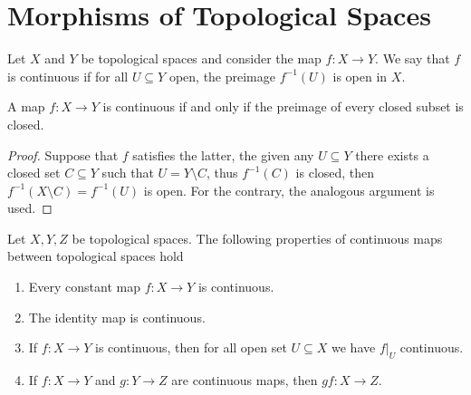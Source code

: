 \section{Morphisms of Topological Spaces}

\begin{definition}\label{def: continuous map}
Let \(X\) and \(Y\) be topological spaces and consider the map \(f : X \to Y\). We
say that \(f\) is continuous if for all \(U \subseteq Y\) open, the preimage
\(f^{-1}(U)\) is open in \(X\).
\end{definition}

\begin{proposition}
A map \(f : X \to Y\) is continuous if and only if the preimage of every closed
subset is closed.
\end{proposition}

\begin{proof}
Suppose that \(f\) satisfies the latter, the given any \(U \subseteq Y\) there
exists a closed set \(C \subseteq Y\) such that \(U = Y \setminus C\), thus
\(f^{-1}(C)\) is closed, then \(f^{-1}(X \setminus C) = f^{-1}(U)\) is open. For
the contrary, the analogous argument is used.
\end{proof}

\begin{proposition}\label{prop: continuous maps properties}
Let \(X, Y, Z\) be topological spaces. The following properties of continuous
maps between topological spaces hold
\begin{enumerate}[(CM1)]
  \item Every constant map \(f: X \to Y\) is continuous.
  \item The identity map is continuous.
  \item If \(f: X \to Y\) is continuous, then for all open set \(U \subseteq X\)
    we have \(f|_U\) continuous.
  \item If \(f: X \to Y\) and \(g: Y \to Z\) are continuous maps, then \(g f : X
    \to Z\).
\end{enumerate}
\end{proposition}

